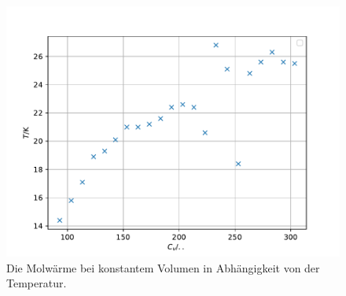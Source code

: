 \begin{figure}
  \centering
  \includegraphics{cv.pdf}
  \caption{Die Molwärme bei konstantem Volumen in Abhängigkeit von der Temperatur.}
  \label{fig:cv}
\end{figure}

 
 
 



 
 
 
 
 
 

 
 




